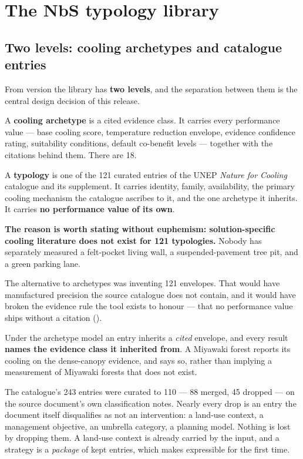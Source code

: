 \section{The NbS typology library}
\label{sec:typologies}

\subsection{Two levels: cooling archetypes and catalogue entries}
\label{sec:archetypes}

From version \methver{} the library has \textbf{two levels}, and the separation
between them is the central design decision of this release.

A \textbf{cooling archetype} is a cited evidence class. It carries every
performance value --- base cooling score, temperature reduction envelope,
evidence confidence rating, suitability conditions, default co-benefit levels
--- together with the citations behind them. There are \num{18}.

A \textbf{typology} is one of the \num{121} curated entries of the UNEP
\emph{Nature for Cooling} catalogue and its supplement. It carries identity,
family, availability, the primary cooling mechanism the catalogue ascribes to
it, and the one archetype it inherits. It carries \textbf{no performance value
of its own}.

\begin{keynote}
\noindent\textbf{The reason is worth stating without euphemism: solution-specific
cooling literature does not exist for \num{121} typologies.} Nobody has
separately measured a felt-pocket living wall, a suspended-pavement tree pit,
and a green parking lane.

The alternative to archetypes was inventing \num{121} envelopes. That would have
manufactured precision the source catalogue does not contain, and it would have
broken the evidence rule the tool exists to honour --- that no performance value
ships without a citation ().

Under the archetype model an entry inherits a \emph{cited} envelope, and every
result \textbf{names the evidence class it inherited from}. A Miyawaki forest
reports its cooling on the dense-canopy evidence, and says so, rather than
implying a measurement of Miyawaki forests that does not exist.
\end{keynote}

The catalogue's \num{243} entries were curated to \num{110} --- \num{88} merged,
\num{45} dropped --- on the source document's own classification notes. Nearly
every drop is an entry the document itself disqualifies as not an intervention:
a land-use context, a management objective, an umbrella category, a planning
model. Nothing is lost by dropping them. A land-use context is already carried
by the  input, and a strategy is a \emph{package} of kept
entries, which  makes expressible for the first time.

